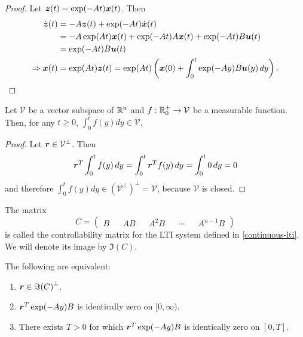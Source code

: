 \begin{proof}
Let $\boldsymbol{z}(t) = \exp(-At) \boldsymbol{x}(t)$. Then
\begin{align*}
\dot{\boldsymbol{z}}(t) &= -A \boldsymbol{z}(t) + \exp(-At) \dot{\boldsymbol{x}}(t) \\
&= -A \exp(At) \boldsymbol{x}(t) + \exp(-At) A \boldsymbol{x}(t) + \exp(-At) B \boldsymbol{u}(t) \\
&= \exp(-At) B \boldsymbol{u}(t) \\
\Rightarrow \boldsymbol{x}(t) &= \exp(At) \boldsymbol{z}(t) = \exp(At) \left( \boldsymbol{x}(0) + \int_{0}^{t} \exp(-Ay) B \boldsymbol{u}(y) \, dy \right) .
\end{align*}
\end{proof}

\begin{lemma}
\label{integral-invariance}
Let $\mathcal{V}$ be a vector subspace of $\mathbb{R}^{n}$ and $f : \mathbb{R}^{+}_{0} \rightarrow \mathcal{V}$ be a measurable function. Then, for any $t \geq 0$, $\int_{0}^{t} f(y) dy \in \mathcal{V}$.
\end{lemma}

\begin{proof}
Let $\boldsymbol{r} \in \mathcal{V}^{\perp}$. Then
\begin{equation*}
\boldsymbol{r}^{T} \int_{0}^{t} f(y) \, dy = \int_{0}^{t} \boldsymbol{r}^{T} f(y) \, dy = \int_{0}^{t} 0 \, dy = 0
\end{equation*}
and therefore $\int_{0}^{t} f(y) dy \in {(\mathcal{V}^{\perp})}^{\perp} = \mathcal{V}$, because $\mathcal{V}$ is closed.
\end{proof}

The matrix
\begin{equation}
C= \begin{pmatrix} B && AB && A^{2} B && \cdots && A^{n-1}B \end{pmatrix}
\end{equation}
is called the controllability matrix for the LTI system defined in \cref{continuous-lti}. We will denote its image by $\Im(C)$.

\begin{lemma}
\label{orthogonality-equivalence}
The following are equivalent:
\begin{enumerate}
\item $\boldsymbol{r} \in \Im{(C)}^{\perp}$.
\item $\boldsymbol{r}^{T} \exp(-Ay) B$ is identically zero on $[0,\infty)$.
\item There exists $T>0$ for which $\boldsymbol{r}^{T} \exp(-Ay) B$ is identically zero on $[0,T]$.
\end{enumerate}
\end{lemma}

